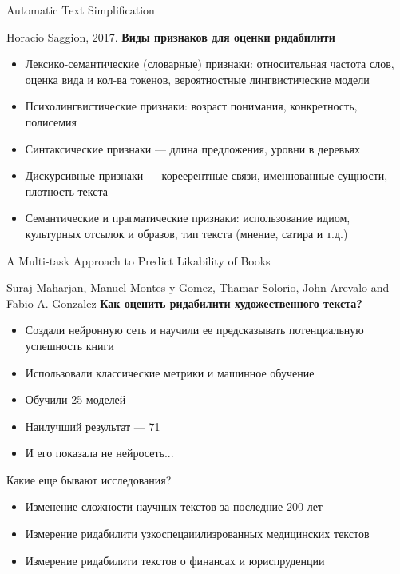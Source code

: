 \documentclass{beamer}
\begin{document}
\begin{frame}{Automatic Text Simplification}

Horacio Saggion, 2017.
\textbf{Виды признаков для оценки ридабилити} 
\begin{itemize}
\item Лексико-семантические (словарные) признаки: относительная частота слов, оценка вида и кол-ва токенов, вероятностные лингвистические модели
\item Психолингвистические признаки: возраст понимания, конкретность, полисемия 
\item Синтаксические признаки — длина предложения, уровни в деревьях 
\item Дискурсивные признаки — кореерентные связи, именнованные сущности, плотность текста
\item Семантические и прагматические признаки: использование идиом, культурных отсылок и образов, тип текста (мнение, сатира и т.д.)
\end{itemize}
\end{frame}

\begin{frame}{A Multi-task Approach to Predict Likability of Books}

Suraj Maharjan, Manuel Montes-y-Gomez, Thamar Solorio, John Arevalo and Fabio A. Gonzalez
\textbf{Как оценить ридабилити художественного текста?} 
\begin{itemize}
\item Создали нейронную сеть и научили ее предсказывать потенциальную успешность книги
\item Использовали классические метрики и машинное обучение
\item Обучили 25 моделей
\item Наилучший результат — 71%
\item И его показала не нейросеть...
\end{itemize}
\end{frame}

\begin{frame}{Какие еще бывают исследования?}

\begin{itemize}
\item Изменение сложности научных текстов за последние 200 лет
\item Измерение ридабилити узкоспецаиилизрованных медицинских текстов
\item Измерение ридабилити текстов о финансах и юриспруденции

\end{itemize}
\end{frame}
\end{document}
